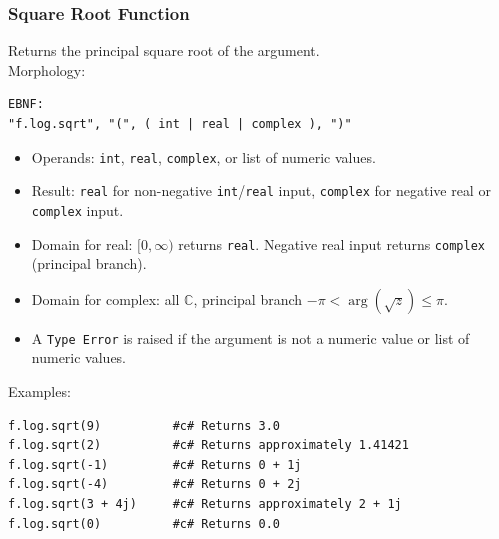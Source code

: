 \subsubsection{Square Root Function}
Returns the principal square root of the argument. \\
Morphology:
\begin{verbatim}
EBNF:
"f.log.sqrt", "(", ( int | real | complex ), ")"
\end{verbatim}
\begin{itemize}
\item Operands: \texttt{int}, \texttt{real}, \texttt{complex}, or list of numeric values.
\item Result: \texttt{real} for non-negative \texttt{int}/\texttt{real} input, \texttt{complex} for negative real or \texttt{complex} input.
\item Domain for real: $[0, \infty)$ returns \texttt{real}. Negative real input returns \texttt{complex} (principal branch).
\item Domain for complex: all $\mathbb{C}$, principal branch $-\pi < \arg(\sqrt{z}) \leq \pi$.
\item A \texttt{Type Error} is raised if the argument is not a numeric value or list of numeric values.
\end{itemize}
Examples:
\begin{verbatim}
f.log.sqrt(9)          #c# Returns 3.0
f.log.sqrt(2)          #c# Returns approximately 1.41421
f.log.sqrt(-1)         #c# Returns 0 + 1j
f.log.sqrt(-4)         #c# Returns 0 + 2j
f.log.sqrt(3 + 4j)     #c# Returns approximately 2 + 1j
f.log.sqrt(0)          #c# Returns 0.0
\end{verbatim}

